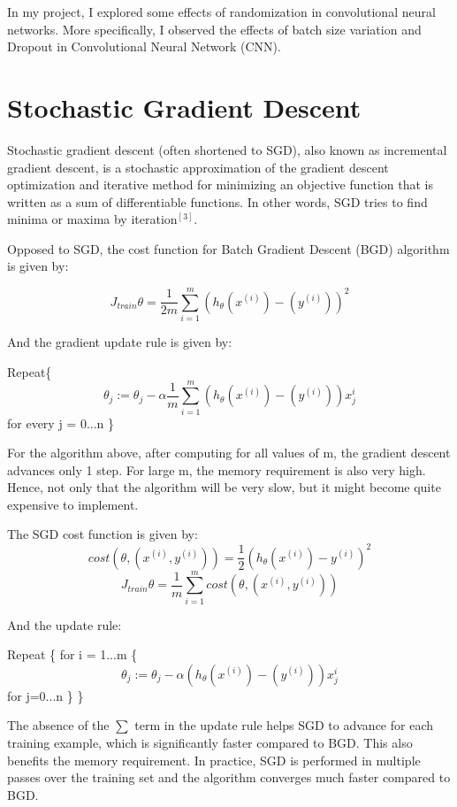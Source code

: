 \documentclass{article}
\begin{document}
In my project, I explored some effects of randomization in convolutional neural networks. More specifically, I observed the effects of batch size variation and Dropout in Convolutional Neural Network (CNN).


\section*{Stochastic Gradient Descent}
Stochastic gradient descent (often shortened to SGD), also known as incremental gradient descent, is a stochastic approximation of the gradient descent optimization and iterative method for minimizing an objective function that is written as a sum of differentiable functions. In other words, SGD tries to find minima or maxima by iteration$^{[3]}$. 

Opposed to SGD, the cost function for  Batch Gradient Descent (BGD) algorithm is given by:

$$J_{train} {\theta} = \frac{1}{2m} \sum_{i=1}^{m} (h_{\theta} (x^{(i)}) - (y^{(i)})) ^{2}$$

And the gradient update rule is given by:
\newline
\begin{center}
Repeat\{
	$$ \theta_{j} :=  \theta_{j} - \alpha \frac{1}{m} \sum_{i=1}^{m} (h_{\theta} (x^{(i)}) - (y^{(i)})) x_{j}^{i}$$
	for  every  j = 0...n
\}
\end{center}

For the algorithm above, after computing for all values of m, the gradient descent advances only 1 step. For large m, the memory requirement is also very high. Hence, not only that the algorithm will be very slow, but it might become quite expensive to implement.

The SGD cost function is given by:
$$cost(\theta, (x^{(i)}, y^{(i)})) = \frac{1}{2} (h_{\theta}(x^{(i)}) - y^{(i)} )^{2}$$
$$J_{train} {\theta} = \frac{1}{m} \sum_{i=1}^{m} cost(\theta, (x^{(i)}, y^{(i)}))$$

And the update rule:
\begin{center}
	 Repeat \{ for i = 1...m \{
		$$\theta_{j} := \theta_{j} - \alpha (h_{\theta} (x^{(i)}) - (y^{(i)})) x_{j}^{i}$$
		for j=0...n
	\}
\}
\end{center}
The absence of the $\sum$ term in the update rule helps SGD to advance for each training example, which is significantly faster compared to BGD. This also benefits the memory requirement. In practice, SGD is performed in multiple passes over the training set and the algorithm converges much faster compared to BGD.
 
\end{document}
